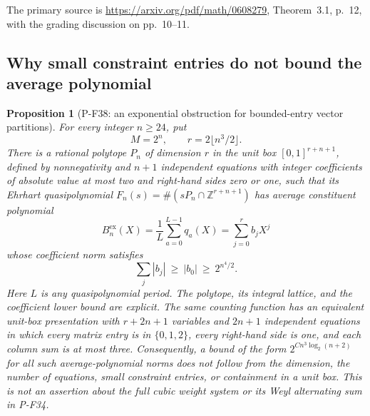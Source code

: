 \documentclass[11pt,a4paper]{article}
\newtheorem{proposition}{Proposition}[section]
\begin{document}
The primary source is
\url{https://arxiv.org/pdf/math/0608279}, Theorem~3.1,
p.~12, with the grading discussion on pp.~10--11.


\subsection{Why small constraint entries do not bound the average polynomial}

\begin{proposition}[P-F38: an exponential obstruction for bounded-entry vector partitions]
\label{prop:boundedentryaverage}
For every integer $n\ge24$, put
\[
 M=2^n,\qquad r=2\lfloor n^3/2\rfloor.
 \tag{P-F38a}
\]
There is a rational polytope $P_n$ of dimension $r$ in the
unit box $[0,1]^{r+n+1}$, defined by nonnegativity and $n+1$
independent equations with integer coefficients of absolute
value at most two and right-hand sides zero or one, such that
its Ehrhart quasipolynomial $F_n(s)=\#(sP_n\cap\mathbb Z^{r+n+1})$
has average constituent polynomial
\[
 B_n^{\mathrm{ex}}(X)=\frac1L\sum_{a=0}^{L-1}q_a(X)
      =\sum_{j=0}^{r}b_jX^j
\]
whose coefficient norm satisfies
\[
 \sum_j|b_j|\ \ge\ |b_0|\ \ge\ 2^{n^4/2}.
 \tag{P-F38b}
\]
Here $L$ is any quasipolynomial period. The polytope, its
integral lattice, and the coefficient lower bound are explicit.
The same counting function has an equivalent unit-box
presentation with $r+2n+1$ variables and $2n+1$ independent
equations in which every matrix entry is in $\{0,1,2\}$,
every right-hand side is one, and each column sum is at most
three.
Consequently, a bound of the form
$2^{C n^3\log_2(n+2)}$ for all such average-polynomial norms
does not follow from the dimension, the number of equations,
small constraint entries, or containment in a unit box.
This is not an assertion about the full cubic weight system
or its Weyl alternating sum in P-F34.
\end{proposition}
\end{document}

